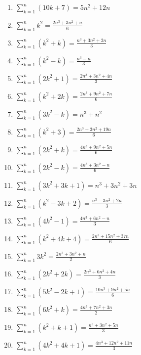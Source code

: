 \documentclass[11pt,a4paper]{article}
\begin{document}
\begin{enumerate}
\item $\displaystyle \sum_{k=1}^{n} \left(10k + 7\right) = 5n^{2} + 12n$
\item $\displaystyle \sum_{k=1}^{n} k^{2} = \frac{2n^{3} + 3n^{2} + n}{6}$
\item $\displaystyle \sum_{k=1}^{n} \left(k^{2} + k\right) = \frac{n^{3} + 3n^{2} + 2n}{3}$
\item $\displaystyle \sum_{k=1}^{n} \left(k^{2} - k\right) = \frac{n^{3} - n}{3}$
\item $\displaystyle \sum_{k=1}^{n} \left(2k^{2} + 1\right) = \frac{2n^{3} + 3n^{2} + 4n}{3}$
\item $\displaystyle \sum_{k=1}^{n} \left(k^{2} + 2k\right) = \frac{2n^{3} + 9n^{2} + 7n}{6}$
\item $\displaystyle \sum_{k=1}^{n} \left(3k^{2} - k\right) = n^{3} + n^{2}$
\item $\displaystyle \sum_{k=1}^{n} \left(k^{2} + 3\right) = \frac{2n^{3} + 3n^{2} + 19n}{6}$
\item $\displaystyle \sum_{k=1}^{n} \left(2k^{2} + k\right) = \frac{4n^{3} + 9n^{2} + 5n}{6}$
\item $\displaystyle \sum_{k=1}^{n} \left(2k^{2} - k\right) = \frac{4n^{3} + 3n^{2} - n}{6}$
\item $\displaystyle \sum_{k=1}^{n} \left(3k^{2} + 3k + 1\right) = n^{3} + 3n^{2} + 3n$
\item $\displaystyle \sum_{k=1}^{n} \left(k^{2} - 3k + 2\right) = \frac{n^{3} - 3n^{2} + 2n}{3}$
\item $\displaystyle \sum_{k=1}^{n} \left(4k^{2} - 1\right) = \frac{4n^{3} + 6n^{2} - n}{3}$
\item $\displaystyle \sum_{k=1}^{n} \left(k^{2} + 4k + 4\right) = \frac{2n^{3} + 15n^{2} + 37n}{6}$
\item $\displaystyle \sum_{k=1}^{n} 3k^{2} = \frac{2n^{3} + 3n^{2} + n}{2}$
\item $\displaystyle \sum_{k=1}^{n} \left(2k^{2} + 2k\right) = \frac{2n^{3} + 6n^{2} + 4n}{3}$
\item $\displaystyle \sum_{k=1}^{n} \left(5k^{2} - 2k + 1\right) = \frac{10n^{3} + 9n^{2} + 5n}{6}$
\item $\displaystyle \sum_{k=1}^{n} \left(6k^{2} + k\right) = \frac{4n^{3} + 7n^{2} + 3n}{2}$
\item $\displaystyle \sum_{k=1}^{n} \left(k^{2} + k + 1\right) = \frac{n^{3} + 3n^{2} + 5n}{3}$
\item $\displaystyle \sum_{k=1}^{n} \left(4k^{2} + 4k + 1\right) = \frac{4n^{3} + 12n^{2} + 11n}{3}$

\end{enumerate}
\end{document}
